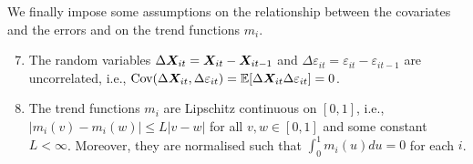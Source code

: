 \documentclass[12pt]{article}
\begin{document}
We finally impose some assumptions on the relationship between the covariates and the errors and on the trend functions $m_i$.
\begin{enumerate}[label=(C\arabic*),leftmargin=1.05cm, itemsep=0pt, parsep=0pt, topsep=3pt]
\setcounter{enumi}{6}
\item \label{C-reg-err} The random variables $\Delta \boldsymbol{X}_{it} = \boldsymbol{X}_{it} - \boldsymbol{X}_{it-1}$ and $\Delta \varepsilon_{it} = \varepsilon_{it} - \varepsilon_{it-1}$ are uncorrelated, i.e., $\textnormal{Cov}(\Delta \boldsymbol{X}_{it}, \Delta \varepsilon_{it}) = \mathbb{E}[\Delta \boldsymbol{X}_{it} \Delta \varepsilon_{it}] = 0$. 
\item \label{C-trend} The trend functions $m_i$ are Lipschitz continuous on $[0,1]$, i.e., $|m_i(v) - m_i(w)| \le L |v-w|$ for all $v,w \in [0,1]$ and some constant $L < \infty$. Moreover, they are normalised such that $\int_0^1m_i (u)du = 0$ for each $i$.
\end{enumerate}


\end{document}
